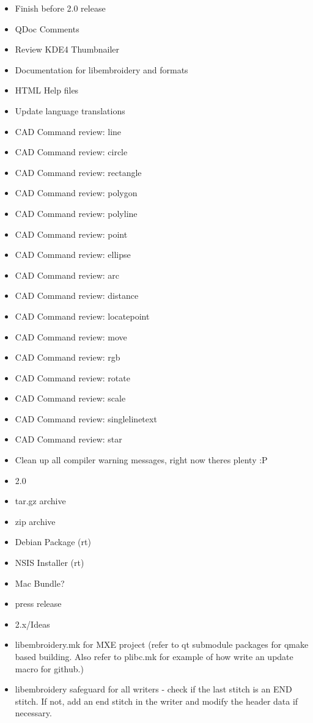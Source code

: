 \documentclass[a4paper]{report}
\begin{document}
\begin{itemize}
\item Finish before 2.0 release
  \item QDoc Comments
  \item Review KDE4 Thumbnailer
  \item Documentation for libembroidery and formats
  \item HTML Help files
  \item Update language translations
  \item CAD Command review: line
  \item CAD Command review: circle
  \item CAD Command review: rectangle
  \item CAD Command review: polygon
  \item CAD Command review: polyline
  \item CAD Command review: point
  \item CAD Command review: ellipse
  \item CAD Command review: arc
  \item CAD Command review: distance
  \item CAD Command review: locatepoint
  \item CAD Command review: move
  \item CAD Command review: rgb
  \item CAD Command review: rotate
  \item CAD Command review: scale
  \item CAD Command review: singlelinetext
  \item CAD Command review: star
  \item Clean up all compiler warning messages, right now theres plenty :P
\item 2.0
  \item tar.gz archive
  \item zip archive
  \item Debian Package (rt)
  \item NSIS Installer (rt)
  \item Mac Bundle?
  \item press release
\item 2.x/Ideas
  \item libembroidery.mk for MXE project (refer to qt submodule packages for qmake based building. Also refer to plibc.mk for example of how write an update macro for github.)
  \item libembroidery safeguard for all writers - check if the last stitch is an END stitch. If not, add an end stitch in the writer and modify the header data if necessary.

\end{itemize}
\end{document}
